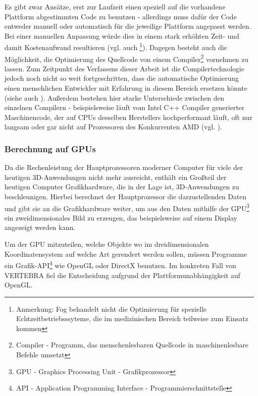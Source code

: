 \documentclass[pdftex,a4paper,titlepage,12pt]{scrartcl}
\newtheorem[L]{boxedDefinition}{Definition}
\begin{document}
Es gibt zwar Ansätze, erst zur Laufzeit einen speziell auf die vorhandene Plattform abgestimmten Code zu benutzen - allerdings muss dafür der Code entweder manuell oder automatisch für die jeweilige Plattform angepasst werden. Bei einer manuellen Anpassung würde dies in einem stark erhöhten Zeit- und damit Kostenaufwand resultieren (vgl. auch \cite{Fog2010}\footnote{Anmerkung: Fog behandelt nicht die Optimierung für spezielle Echtzeitbetriebsssyteme, die im medizinischen Bereich teilweise zum Einsatz kommen}). Dagegen besteht auch die Möglichkeit, die Optimierung des Quellcode von einem Compiler\footnote{Compiler - Programm, das menschenlesbaren Quellcode in maschinenlesbare Befehle umsetzt} vornehmen zu lassen. Zum Zeitpunkt des Verfassens dieser Arbeit ist die Compilertechnologie jedoch noch nicht so weit fortgeschritten, dass die automatische Optimierung einen menschlichen Entwickler mit Erfahrung in diesem Bereich ersetzen könnte (siehe auch \cite{Fog2010}). Außerdem bestehen hier starke Unterschiede zwischen den einzelnen Compilern - beispielsweise läuft vom Intel C++ Compiler generierter Maschinencode, der auf CPUs desselben Herstellers hochperformant läuft, oft nur langsam oder gar nicht auf Prozessoren des Konkurrenten AMD (vgl. \cite[Kapitel 2.5, Seite 10]{Fog2010}).
\subsubsection{Berechnung auf GPUs}\label{sssec:gpucalculation}
Da die Rechenleistung der Hauptprozessoren moderner Computer für viele der heutigen 3D-Anwendungen nicht mehr ausreicht, enthält ein Großteil der heutigen Computer Grafikhardware, die in der Lage ist, 3D-Anwendungen zu beschleunigen. Hierbei berechnet der Hauptprozessor die darzustellenden Daten und gibt sie an die Grafikhardware weiter, um aus den Daten mithilfe der GPU\footnote{GPU - Graphics Processing Unit - Grafikprozessor} ein zweidimensionales Bild zu erzeugen, das beispielsweise auf einem Display angezeigt werden kann.

Um der GPU mitzuteilen, welche Objekte wo im dreidimensionalen Koordinatensystem auf welche Art gerendert werden sollen, müssen Programme ein Grafik-API\footnote{API - Application Programming Interface - Programmierschnittstelle} wie OpenGL oder DirectX benutzen. Im konkreten Fall von VERTEBRA fiel die Entscheidung aufgrund der Plattformunabhängigkeit auf OpenGL.
\end{document}
